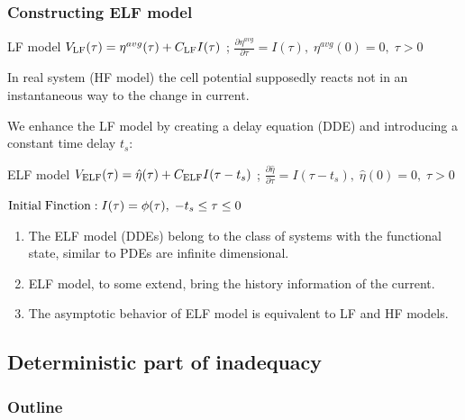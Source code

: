 \documentclass[10pt,xcolor=dvipsnames,compress]{beamer}
\begin{document}
\begin{frame}
\frametitle{Constructing ELF model}
\vfill


\begin{block}{LF model}
$
V_{\rm LF}(\tau) = {\eta}^{avg}(\tau) + C_{\rm LF} I(\tau)
$
; \quad
$
\frac{\partial{\eta}^{avg}}{\partial\tau} = I(\tau), \; {\eta}^{avg}(0)=0, \;  \tau>0 
$
\end{block}

\pause

In real system (HF model) the cell potential supposedly reacts not in an instantaneous way to the change in current.

\pause
We enhance the LF model by creating a delay equation (DDE) and introducing a constant time delay $t_s
$:



\begin{alertblock}{ELF model}
$
V_{\rm ELF}(\tau) = \hat{\eta}(\tau) + C_{\rm ELF} I(\tau - t_s)
$
; \quad
$
\frac{\partial{\hat{\eta}}}{\partial\tau} = I(\tau- t_s), \; {\hat{\eta}}(0)=0, \;  \tau>0
$
\begin{center}
$
{\rm Initial \; Finction:\;} I(\tau)=\phi(\tau), \;  -t_s \leq \tau \leq 0
$
\end{center}
\end{alertblock}


\begin{enumerate}
\item The ELF model (DDEs) belong to the class of systems with the functional state, similar to PDEs are infinite dimensional. 

\item ELF model, to some extend, bring the history information of the current.

\item The asymptotic behavior of ELF model is equivalent to LF and HF models.

\end{enumerate}


\vfill
\end{frame}


\subsection{Deterministic part of inadequacy}
\begin{frame}
\frametitle{Outline}
\vfill

\vspace{0.7in}
\vspace{0.7in}

\vfill
\end{frame}
\end{document}
